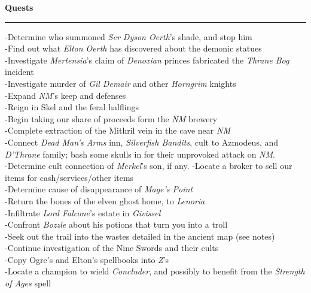 \documentclass[letterpaper]{article}
\newcommand{\e}[1]{\emph{#1}}
\newcommand{\B}[1]{\textbf{#1}}
\newenvironment{notesection}[1]
{ {\huge \B{#1}}\hrule\vspace{0.5em}\begingroup\fontsize{9pt}{12pt}\selectfont}
{\endgroup}
\begin{document}
\begin{notesection}{Quests}
-Determine who summoned \e{Ser Dyson Oerth}'s shade, and stop him\\
-Find out what \e{Elton Oerth} has discovered about the demonic statues\\
-Investigate \e{Mertensia}'s claim of \e{Denoxian} princes fabricated the \e{Thrane Bog} incident\\
-Investigate murder of \e{Gil Demair} and other \e{Horngrim} knights\\

-Expand \e{NM}'s keep and defenses\\
-Reign in Skel and the feral halflings\\
-Begin taking our share of proceeds form the \e{NM} brewery\\
-Complete extraction of the Mithril vein in the cave near \e{NM}\\

-Connect \e{Dead Man's Arms} inn, \e{Silverfish Bandits}, cult to Azmodeus, and \e{D'Thrane} family; bash some skulls in for their unprovoked attack on \e{NM}.\\
-Determine cult connection of \e{Merkel}'s son, if any.
-Locate a broker to sell our items for cash/services/other items\\

-Determine cause of disappearance of \e{Mage's Point}\\
-Return the bones of the elven ghost home, to \e{Lenoria}\\
-Infiltrate \e{Lord Falcone}'s estate in \e{Givissel}\\

-Confront \e{Bozzle} about his potions that turn you into a troll\\
-Seek out the trail into the wastes detailed in the ancient map (see notes)\\
-Continue investigation of the Nine Swords and their cults\\

-Copy Ogre's and Elton's spellbooks into \e{Z}'s\\
-Locate a champion to wield \e{Concluder}, and possibly to benefit from the \e{Strength of Ages} spell\\
\end{notesection}
\end{document}
